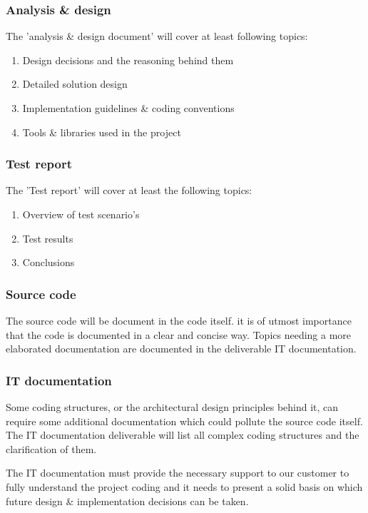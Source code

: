 \subsubsection{Analysis \& design}

The 'analysis \& design document' will cover at least following topics:

 	\begin{enumerate}
		\item Design decisions and the reasoning behind them
		\item Detailed solution design
		\item Implementation guidelines \& coding conventions
		\item Tools \& libraries used in the project
	\end {enumerate}

\subsubsection{Test report}

The 'Test report' will cover at least the following topics:

 	\begin{enumerate}
		\item Overview of test scenario's
		\item Test results
		\item Conclusions
	\end {enumerate}

\subsubsection{Source code}

The source code will be document in the code itself. it is of utmost importance that the code is documented in a clear and concise way.
Topics needing a more elaborated documentation are documented in the deliverable IT documentation.

\subsubsection{IT documentation}

Some coding structures, or the architectural design principles behind it, can require some additional documentation which could pollute the source code itself.
The IT documentation deliverable will list all complex coding structures and the clarification of them.

The IT documentation must provide the necessary support to our customer to fully understand the project coding and it needs to present a solid basis on which future design \& implementation decisions can be taken.

